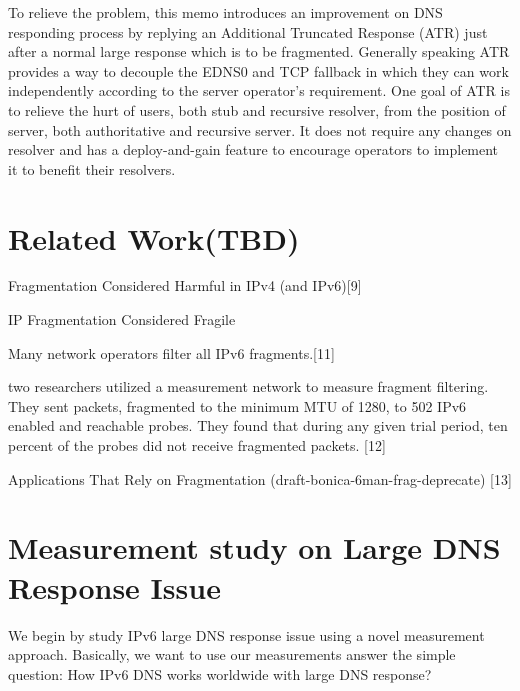To relieve the problem, this memo introduces an improvement on
DNS responding process by replying an Additional Truncated Response
(ATR) just after a normal large response which is to be fragmented.
Generally speaking ATR provides a way to decouple the EDNS0 and TCP
fallback in which they can work independently according to the server
operator's requirement.  One goal of ATR is to relieve the hurt of
users, both stub and recursive resolver, from the position of server,
both authoritative and recursive server.  It does not require any
changes on resolver and has a deploy-and-gain feature to encourage
operators to implement it to benefit their resolvers.



\section{Related Work(TBD)}



Fragmentation Considered Harmful in IPv4 (and IPv6)[9]

IP Fragmentation Considered Fragile 

Many network operators filter all IPv6 fragments.[11]

two researchers utilized a measurement network to measure 
fragment filtering.  They sent packets, fragmented to the 
minimum MTU of 1280, to 502 IPv6 enabled and reachable 
probes. They found that during any given trial period, 
ten percent of the probes did not receive fragmented packets. [12]

Applications That Rely on Fragmentation (draft-bonica-6man-frag-deprecate) [13]




\section{Measurement study on Large DNS Response Issue}

We begin by study IPv6 large DNS response issue using a 
novel measurement approach. Basically, we want to use our 
measurements answer the simple question: How IPv6 DNS 
works worldwide with large DNS response? 

